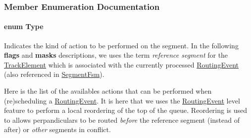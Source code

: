 \subsubsection{Member Enumeration Documentation}
\hypertarget{classKite_1_1SegmentAction_a1d1cfd8ffb84e947f82999c682b666a7}{
\paragraph[{Type}]{\setlength{\rightskip}{0pt plus 5cm}enum {\bf Type}}}\label{classKite_1_1SegmentAction_a1d1cfd8ffb84e947f82999c682b666a7}
Indicates the kind of action to be performed on the segment. In the following {\bfseries flags} and {\bfseries masks} descriptions, we uses the term {\itshape reference segment} for the \hyperlink{classKite_1_1TrackElement}{Track\-Element} which is associated with the currently processed \hyperlink{classKite_1_1RoutingEvent}{Routing\-Event} (also referenced in \hyperlink{classKite_1_1SegmentFsm}{Segment\-Fsm}).

Here is the list of the availables actions that can be performed when (re)scheduling a \hyperlink{classKite_1_1RoutingEvent}{Routing\-Event}. It is here that we uses the \hyperlink{classKite_1_1RoutingEvent}{Routing\-Event} level feature to perform a local reordering of the top of the queue. Reordering is used to allows perpandiculars to be routed {\itshape before} the reference segment (instead of after) or {\itshape other} segments in conflict.


